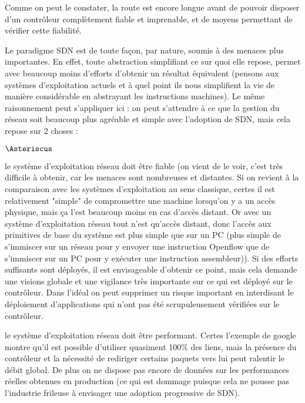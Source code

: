 Comme on peut le constater, la route est encore longue avant de pouvoir disposer d'un contrôleur complètement fiable et imprenable, et de moyens permettant de vérifier cette fiabilité.

Le paradigme SDN est de toute façon, par nature, soumis à des menaces plus importantes. En effet, toute abstraction simplifiant ce sur quoi elle repose, permet avec beaucoup moins d'efforts d'obtenir un résultat équivalent (pensons aux systèmes d'exploitation actuels et à quel point ils nous simplifient la vie de manière considérable en abstrayant les instructions machines). Le même raisonnement peut s'appliquer ici : on peut s'attendre à ce que la gestion du réseau soit beaucoup plus agréable et simple avec l'adoption de SDN, mais cela repose sur 2 choses :

\begin{list}{$\Asteriscus$}{}

\item le système d'exploitation réseau doit être fiable (on vient de le voir, c'est très difficile à obtenir, car les menaces sont nombreuses et distantes. Si on revient à la comparaison avec les systèmes d'exploitation au sens classique, certes il est relativement "simple" de compromettre une machine lorsqu'on y a un accès physique, mais ça l'est beaucoup moins en cas d'accès distant. Or avec un système d'exploitation réseau tout n'est qu'accès distant, donc l'accès aux primitives de base du système est plus simple que sur un PC (plus simple de s'immiscer sur un réseau pour y envoyer une instruction Openflow que de s'immiscer sur un PC pour y exécuter une instruction assembleur)). Si des efforts suffisants sont déployés, il est envisageable d'obtenir ce point, mais cela demande une visions globale et une vigilance très importante sur ce qui est déployé sur le contrôleur. Dans l'idéal on peut supprimer un risque important en interdisant le déploiement d'applications qui n'ont pas été scrupuleusement vérifiées sur le contrôleur.
\item le système d'exploitation réseau doit être performant. Certes l'exemple de google montre qu'il est possible d'utiliser quasiment 100\% des liens, mais la présence du contrôleur et la nécessité de rediriger certains paquets vers lui peut ralentir le débit global. De plus on ne dispose pas encore de données sur les performances réelles obtenues en production (ce qui est dommage puisque cela ne pousse pas l'industrie frileuse à envisager une adoption progressive de SDN).

\end{list}

